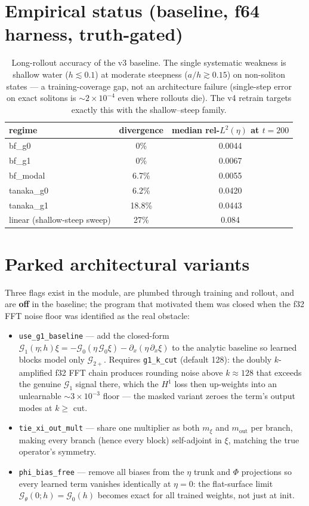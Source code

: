\documentclass[11pt,letterpaper]{article}
\newcommand{\Gop}{\mathcal{G}}
\begin{document}
\section{Empirical status (baseline, f64 harness, truth-gated)}

\begin{table}[h]
\centering
\small
\begin{tabular}{lcc}
\toprule
regime & divergence & median rel-$L^2(\eta)$ at $t{=}200$ \\
\midrule
bf\_g0      & 0\%    & 0.0044 \\
bf\_g1      & 0\%    & 0.0067 \\
bf\_modal   & 6.7\%  & 0.0055 \\
tanaka\_g0  & 6.2\%  & 0.0420 \\
tanaka\_g1  & 18.8\% & 0.0443 \\
linear (shallow-steep sweep) & 27\% & 0.084 \\
\bottomrule
\end{tabular}
\caption{Long-rollout accuracy of the v3 baseline. The single systematic
weakness is shallow water ($h \lesssim 0.1$) at moderate steepness
($a/h \gtrsim 0.15$) on non-soliton states --- a training-coverage gap, not an
architecture failure (single-step error on exact solitons is
$\sim 2\times10^{-4}$ even where rollouts die). The v4 retrain targets exactly
this with the shallow--steep family.}
\end{table}

\section{Parked architectural variants}
\label{sec:parked}

Three flags exist in the module, are plumbed through training and rollout, and
are \textbf{off} in the baseline; the program that motivated them was closed
when the f32 FFT noise floor was identified as the real obstacle:

\begin{itemize}[leftmargin=1.6em, itemsep=2pt]
\item \texttt{use\_g1\_baseline} --- add the closed-form
      $\Gop_1(\eta;h)\xi = -\Gop_0(\eta\,\Gop_0\xi) - \partial_x(\eta\,\partial_x\xi)$
      to the analytic baseline so learned blocks model only $\Gop_{2+}$.
      Requires \texttt{g1\_k\_cut} (default 128): the doubly $k$-amplified f32
      FFT chain produces rounding noise above $k\approx128$ that exceeds the
      genuine $\Gop_1$ signal there, which the $H^1$ loss then up-weights into
      an unlearnable $\sim3\times10^{-3}$ floor --- the masked variant zeroes
      the term's output modes at $k \ge$ cut.
\item \texttt{tie\_xi\_out\_mult} --- share one multiplier as both $m_\xi$ and
      $m_{\mathrm{out}}$ per branch, making every branch (hence every block)
      self-adjoint in $\xi$, matching the true operator's symmetry.
\item \texttt{phi\_bias\_free} --- remove all biases from the $\eta$ trunk and
      $\Phi$ projections so every learned term vanishes identically at
      $\eta = 0$: the flat-surface limit $\Gop_\theta(0;h) = \Gop_0(h)$ becomes
      exact for all trained weights, not just at init.
\end{itemize}
\end{document}
